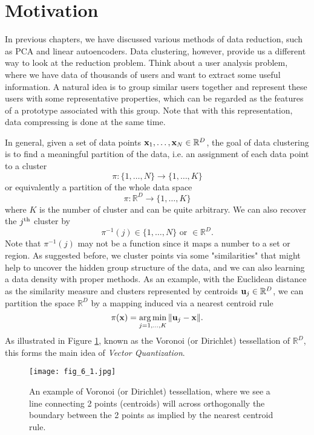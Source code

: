 \documentclass[../main.tex]{subfiles}
\begin{document}
\section{Motivation}
In previous chapters, we have discussed various methods of data reduction, such as PCA and linear autoencoders. Data clustering, however, provide us a different way to look at the reduction problem. Think about a user analysis problem, where we have data of thousands of users and want to extract some useful information. A natural idea is to group similar users together and represent these users with some representative properties, which can be regarded as the features of a prototype associated with this group. Note that with this representation, data compressing is done at the same time. 
\par In general, given a set of data points ${\bf x}_1,\dots, {\bf x}_N\in \mathbb{R}^D$, the goal of data clustering is to find a meaningful partition of the data, i.e. an assignment of each data point to a cluster
\begin{equation*}
\pi : \{1,\dots,N\}\rightarrow \{1,\dots,K\}
\end{equation*}
or equivalently a partition of the whole data space
\begin{equation*}
\pi: \mathbb{R}^{D}\rightarrow \{1,\dots,K\}
\end{equation*}
where $K$ is the number of cluster and can be quite arbitrary. We can also recover the $j^{\rm th}$ cluster by
\begin{equation*}
\pi^{-1}(j)\in\{1,\dots,N\}\text{ or }\in \mathbb{R}^D.
\end{equation*}
Note that $\pi^{-1}(j)$ may not be a function since it maps a number to a set or region. As suggested before, we cluster points via some "similarities" that might help to uncover the hidden group structure of the data, and we can also learning a data density with proper methods. As an example, with the Euclidean distance as the similarity measure and clusters represented by centroids ${\bf u}_j\in\mathbb{R}^D$, we can partition the space $\mathbb{R}^D$ by a mapping induced via a nearest centroid rule
\begin{equation*}
\pi({\bf x}) = \mathop{\arg\min}_{j=1,\dots,K}\|{\bf u}_j-{\bf x}\|.
\end{equation*}
As illustrated in Figure \ref{fig_6_1}, known as the Voronoi (or Dirichlet) tessellation of $\mathbb{R}^D$, this forms the main idea of \emph{Vector Quantization}.
\begin{figure}[h] 
	\centering 
	\texttt{[image: fig\_6\_1.jpg]} 
	\caption{An example of Voronoi (or Dirichlet) tessellation, where we see a line connecting 2 points (centroids) will across orthogonally the boundary between the 2 points as implied by the nearest centroid rule.}\label{fig_6_1}
\end{figure}
\end{document}
